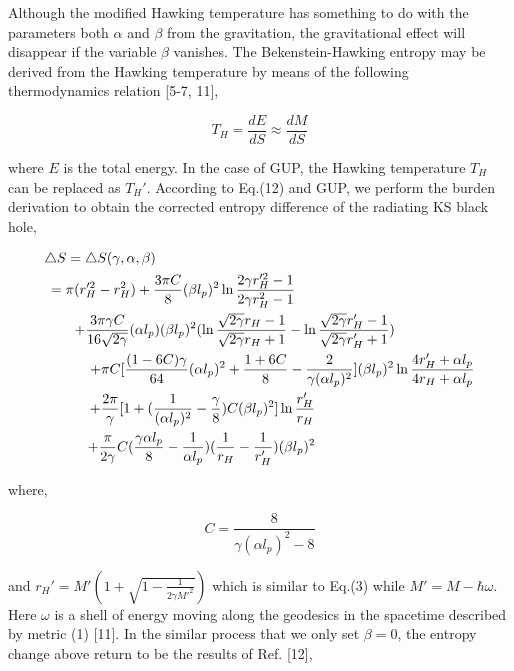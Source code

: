 \documentclass[graphicx, 12pt]{article}
\begin{document}
\noindent Although the modified Hawking temperature has something
to do with the parameters both $\alpha$ and $\beta$ from the
gravitation, the gravitational effect will disappear if the
variable $\beta$ vanishes. The Bekenstein-Hawking entropy may be
derived from the Hawking temperature by means of the following
thermodynamics relation [5-7, 11],

\begin{equation}
T_{H}=\frac{dE}{dS}\approx\frac{dM}{dS}
\end{equation}

\noindent where $E$ is the total energy. In the case of GUP, the
Hawking temperature $T_{H}$ can be replaced as $T_{H}'$. According
to Eq.(12) and GUP, we perform the burden derivation to obtain the
corrected entropy difference of the radiating KS black hole,

\begin{eqnarray}
\triangle S=\triangle S(\gamma, \alpha, \beta)\hspace{8cm}\nonumber\\
=\pi(r_{H}'^{2}-r_{H}^{2})+\frac{3\pi C}{8}(\beta
l_{p})^{2}\ln\frac{2\gamma r_{H}'^{2}-1}{2\gamma
r_{H}^{2}-1}\hspace{4.5cm}\nonumber\\
+\frac{3\pi\gamma C}{16\sqrt{2\gamma}}(\alpha l_{p})(\beta
l_{p})^{2}(\ln\frac{\sqrt{2\gamma}r_{H}-1}{\sqrt{2\gamma}r_{H}+1}
-\ln\frac{\sqrt{2\gamma}r_{H}'-1}{\sqrt{2\gamma}r_{H}'+1})\hspace{2cm}\nonumber\\
+\pi C[\frac{(1-6C)\gamma}{64}(\alpha
l_{p})^{2}+\frac{1+6C}{8}-\frac{2}{\gamma(\alpha
l_{p})^{2}}](\beta l_{p})^{2}\ln\frac{4r_{H}'+\alpha
l_{p}}{4r_{H}+\alpha l_{p}}\nonumber\\
+\frac{2\pi}{\gamma}[1+(\frac{1}{(\alpha
l_{p})^{2}}-\frac{\gamma}{8})C(\beta
l_{p})^{2}]\ln\frac{r_{H}'}{r_{H}}\hspace{4cm}\nonumber\\
+\frac{\pi}{2\gamma}C(\frac{\gamma\alpha l_{p}}{8}-\frac{1}{\alpha
l_{p}})(\frac{1}{r_{H}}-\frac{1}{r_{H}'})(\beta
l_{p})^{2}\hspace{4cm}
\end{eqnarray}

\noindent where,

\begin{equation}
C=\frac{8}{\gamma(\alpha l_{p})^{2}-8}
\end{equation}

\noindent and $r_{H}'=M'(1+\sqrt{1-\frac{1}{2\gamma M'^{2}}})$
which is similar to Eq.(3) while $M'=M-\hbar\omega$. Here $\omega$
is a shell of energy moving along the geodesics in the spacetime
described by metric (1) [11]. In the similar process that we only
set $\beta=0$, the entropy change above return to be the results
of Ref. [12],
\end{document}
